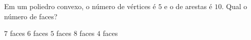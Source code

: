 Em um poliedro convexo, o número de vértices é $5$ e o de arestas é $10$. Qual o número de faces?

$7$ faces
$6$ faces
$5$ faces
$8$ faces
$4$ faces


